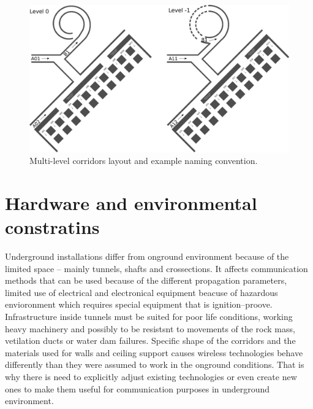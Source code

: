 \documentclass[../main.tex]{subfiles}
\begin{document}
\begin{figure}[ht]
\includegraphics[width=\textwidth]{pictures/mine_with_levels_scheme.pdf}
\centering
\caption{Multi-level corridors layout and example naming convention\cite{Thesis_CM}.}
\label{fig:mine_with_levels_scheme}
\end{figure}


\section{Hardware and environmental constratins} %
\label{sub:hardware_and_environmental_constratins}


Underground installations differ from onground environment because of the limited space -- mainly tunnels, shafts and crossections. It affects communication methods that can be used because of the different propagation parameters, limited use of electrical and electronical equipment beacuse of hazardous envioronment which requires special equipment that is ignition--proove. Infrastructure inside tunnels must be suited for poor life conditions, working heavy machinery and possibly to be resistsnt to movements of the rock mass, vetilation ducts or water dam failures. Specific shape of the corridors and the materials used for walls and ceiling support causes wireless technologies behave differently than they were assumed to work in the onground conditions. That is why there is need to explicitly adjust existing technologies or even create new ones to make them useful for communication purposes in underground environment.
\end{document}
